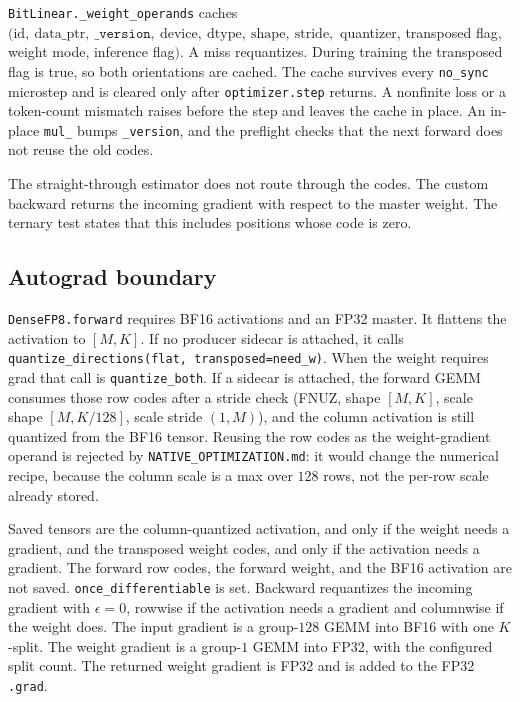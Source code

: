 \documentclass[11pt]{article}
\DeclareRobustCommand{\code}[1]{\texttt{#1}}
\begin{document}
\code{BitLinear.\_weight\_operands} caches
\((\mathrm{id},\ \mathrm{data\_ptr},\ \texttt{\_version},\ \mathrm{device},\ \mathrm{dtype},\ \mathrm{shape},\ \mathrm{stride},\)
quantizer, transposed flag, weight mode, inference flag\()\). A miss
requantizes. During training the transposed flag is true, so both
orientations are cached. The cache survives every \code{no\_sync} microstep
and is cleared only after \code{optimizer.step} returns. A nonfinite loss or
a token-count mismatch raises before the step and leaves the cache in place.
An in-place \code{mul\_} bumps \code{\_version}, and the preflight checks
that the next forward does not reuse the old codes.

The straight-through estimator does not route through the codes. The custom
backward returns the incoming gradient with respect to the master weight.
The ternary test states that this includes positions whose code is zero.

\subsection{Autograd boundary}

\code{DenseFP8.forward} requires BF16 activations and an FP32 master. It
flattens the activation to \([M,K]\). If no producer sidecar is attached, it
calls \code{quantize\_directions(flat, transposed=need\_w)}. When the weight
requires grad that call is \code{quantize\_both}. If a sidecar is attached,
the forward GEMM consumes those row codes after a stride check
(FNUZ, shape \([M,K]\), scale shape \([M,K/128]\), scale stride \((1,M)\)),
and the column activation is still quantized from the BF16 tensor. Reusing
the row codes as the weight-gradient operand is rejected by
\code{NATIVE\_OPTIMIZATION.md}: it would change the numerical recipe,
because the column scale is a max over \(128\) rows, not the per-row scale
already stored.

Saved tensors are the column-quantized activation, and only if the weight
needs a gradient, and the transposed weight codes, and only if the activation
needs a gradient. The forward row codes, the forward weight, and the BF16
activation are not saved. \code{once\_differentiable} is set. Backward
requantizes the incoming gradient with \(\epsilon=0\), rowwise if the
activation needs a gradient and columnwise if the weight does. The input
gradient is a group-\(128\) GEMM into BF16 with one \(K\)-split. The weight
gradient is a group-\(1\) GEMM into FP32, with the configured split count.
The returned weight gradient is FP32 and is added to the FP32 \code{.grad}.
\end{document}
